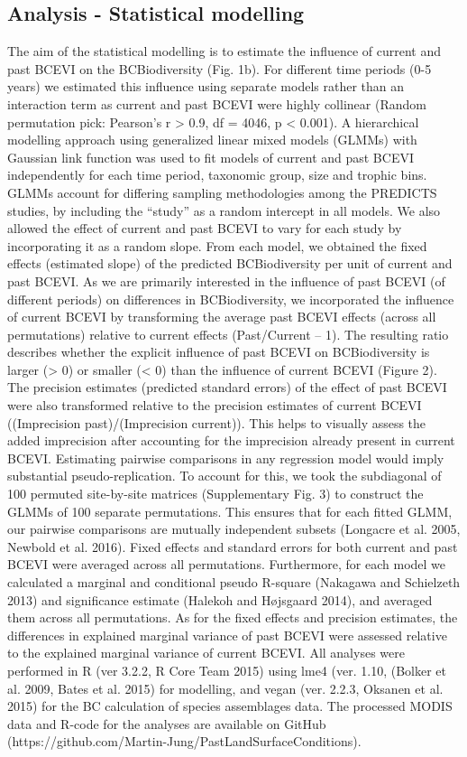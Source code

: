 {\subsection{Analysis - Statistical modelling}
The aim of the statistical modelling is to estimate the influence of current and past BCEVI on the BCBiodiversity (Fig. 1b). For different time periods (0-5 years) we estimated this influence using separate models rather than an interaction term as current and past BCEVI were highly collinear (Random permutation pick: Pearson’s r > 0.9, df = 4046, p < 0.001). A hierarchical modelling approach using generalized linear mixed models (GLMMs) with Gaussian link function was used to fit models of current and past BCEVI independently for each time period, taxonomic group, size and trophic bins. GLMMs account for differing sampling methodologies among the PREDICTS studies, by including the “study” as a random intercept in all models. We also allowed the effect of current and past BCEVI to vary for each study by incorporating it as a random slope. From each model, we obtained the fixed effects (estimated slope) of the predicted BCBiodiversity per unit of current and past BCEVI.
	As we are primarily interested in the influence of past BCEVI (of different periods) on differences in BCBiodiversity, we incorporated the influence of current BCEVI by transforming the average past BCEVI effects (across all permutations) relative to current effects (Past/Current – 1). The resulting ratio describes whether the explicit influence of past BCEVI on BCBiodiversity is larger (> 0) or smaller (< 0) than the influence of current BCEVI (Figure 2). The precision estimates (predicted standard errors) of the effect of past BCEVI were also transformed relative to the precision estimates of current BCEVI ((Imprecision past)/(Imprecision current)). This helps to visually assess the added imprecision after accounting for the imprecision already present in current BCEVI. 
	Estimating pairwise comparisons in any regression model would imply substantial pseudo-replication. To account for this, we took the subdiagonal of 100 permuted site-by-site matrices (Supplementary Fig. 3) to construct the GLMMs of 100 separate permutations. This ensures that for each fitted GLMM, our pairwise comparisons are mutually independent subsets (Longacre et al. 2005, Newbold et al. 2016). Fixed effects and standard errors for both current and past BCEVI were averaged across all permutations. Furthermore, for each model we calculated a marginal and conditional pseudo R-square (Nakagawa and Schielzeth 2013) and significance estimate (Halekoh and Højsgaard 2014), and averaged them across all permutations. As for the fixed effects and precision estimates, the differences in explained marginal variance of past BCEVI were assessed relative to the explained marginal variance of current BCEVI.
	All analyses were performed in R (ver 3.2.2, R Core Team 2015) using lme4 (ver. 1.10, (Bolker et al. 2009, Bates et al. 2015) for modelling, and vegan (ver. 2.2.3, Oksanen et al. 2015) for the BC calculation of species assemblages data. The processed MODIS data and R-code for the analyses are available on GitHub (https://github.com/Martin-Jung/PastLandSurfaceConditions). 

}
